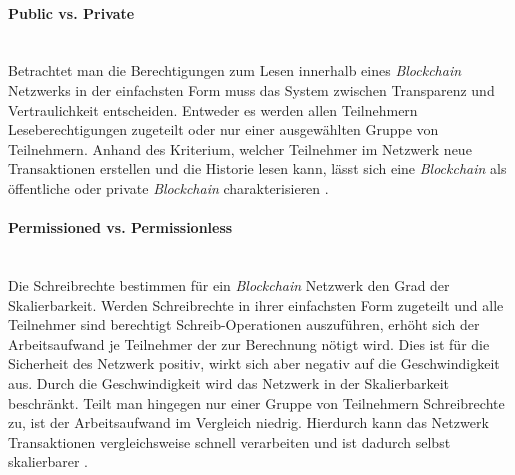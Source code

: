 \paragraph{Public vs. Private}$~~$\\
Betrachtet man die Berechtigungen zum Lesen innerhalb eines \textit{Blockchain} Netzwerks in der einfachsten Form muss das System zwischen Transparenz und Vertraulichkeit entscheiden. Entweder es werden allen Teilnehmern Leseberechtigungen zugeteilt oder nur einer ausgewählten Gruppe von Teilnehmern. Anhand des Kriterium, welcher Teilnehmer im Netzwerk neue Transaktionen erstellen und die Historie lesen kann, lässt sich eine \textit{Blockchain} als öffentliche oder private \textit{Blockchain} charakterisieren \citep{Drescher2017}.

\paragraph{Permissioned vs. Permissionless}$~~$\\
Die Schreibrechte bestimmen für ein \textit{Blockchain} Netzwerk den Grad der Skalierbarkeit. Werden Schreibrechte in ihrer einfachsten Form zugeteilt und alle Teilnehmer sind berechtigt Schreib-Operationen auszuführen, erhöht sich der Arbeitsaufwand je Teilnehmer der zur Berechnung nötigt wird. Dies ist für die Sicherheit des Netzwerk positiv, wirkt sich aber negativ auf die Geschwindigkeit aus. Durch die Geschwindigkeit wird das Netzwerk in der Skalierbarkeit beschränkt. Teilt man hingegen nur einer Gruppe von Teilnehmern Schreibrechte zu, ist der Arbeitsaufwand im Vergleich niedrig. Hierdurch kann das Netzwerk Transaktionen vergleichsweise schnell verarbeiten und ist dadurch selbst skalierbarer \citep{Drescher2017}.

